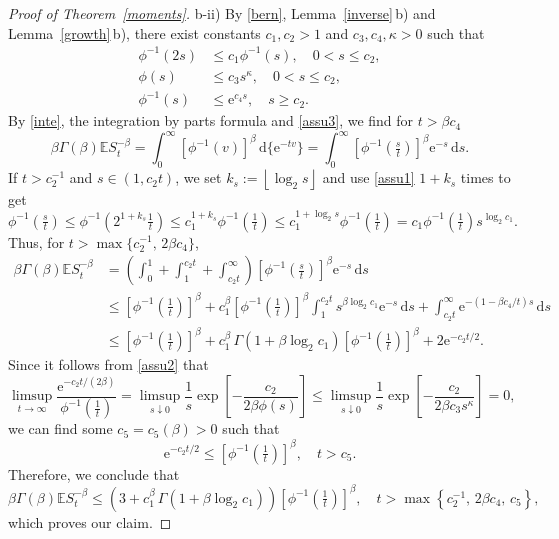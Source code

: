 \documentclass{aptpub}
\newcommand\EE{\mathds E}
\newcommand\dup{\mathrm{d}}
\newcommand\eup{\mathrm{e}}                                %
\numberwithin{equation}{section}
\begin{document}
\begin{proof}[Proof of Theorem~\ref{moments}]
\medskip\noindent b-ii)
By \eqref{bern}, Lemma~\ref{inverse}\,b) and Lemma~\ref{growth}\,b), there exist constants $c_1,c_2>1$ and  $c_3,c_4,\kappa>0$ such that
\begin{align}\label{assu1}
    \phi^{-1}(2s)
    &\leq c_1\phi^{-1}(s), \quad 0<s\leq c_2,
\\ \label{assu2}
    \phi(s)
    &\leq c_3s^\kappa, \quad 0<s\leq c_2,
\\ \label{assu3}
    \phi^{-1}(s)
    &\leq\eup^{c_4s},\quad s\geq c_2.
\end{align}
By \eqref{inte}, the integration by parts formula and \eqref{assu3}, we find for $t>\beta c_4$
$$
    \beta\Gamma(\beta)\EE S_t^{-\beta}
    = \int_0^\infty\left[\phi^{-1}(v)\right]^{\beta} \,\dup\bigl\{\eup^{-tv}\bigr\}
    = \int_0^\infty\left[ \phi^{-1}\left(\tfrac{s}{t}\right) \right]^{\beta}\eup^{-s}\,\dup s.
$$
If $t>c_2^{-1}$ and $s\in(1,c_2t)$, we set $k_s:=\left\lfloor\log_2s\right\rfloor$ and use \eqref{assu1} $1+k_s$ times to get
$$
    \phi^{-1}\left(\tfrac{s}{t}\right)
    \leq\phi^{-1}\left(2^{1+k_s}\tfrac 1{t}\right)
    \leq c_1^{1+k_s}\phi^{-1}\left(\tfrac{1}{t}\right)
    \leq c_1^{1+\log_2s}\phi^{-1}\left(\tfrac{1}{t}\right)
    =c_1\phi^{-1}\left(\tfrac{1}{t}\right)s^{\log_2c_1}.
$$
Thus, for $t>\max\{c_2^{-1},\,2\beta c_4\}$,
\begin{align*}
    \beta\Gamma(\beta)\EE S_t^{-\beta}
    &=\left(\int_0^1+\int_1^{c_2 t} + \int_{c_2 t}^\infty\right)
      \left[ \phi^{-1}\left(\tfrac{s}{t}\right)\right]^{\beta}\eup^{-s}\,\dup s\\
    &\leq\left[\phi^{-1}\left(\tfrac{1}{t}\right)\right]^{\beta}
      + c_1^\beta\left[ \phi^{-1}\left(\tfrac{1}{t}\right) \right]^{\beta}\int_1^{c_2 t} s^{\beta\log_2c_1}\eup^{-s}\,\dup s
      + \int_{c_2 t}^\infty \eup^{-\left(1-\beta c_4/t\right)s}\,\dup s\\
    &\leq \left[\phi^{-1}\left(\tfrac{1}{t}\right)\right]^{\beta}
      + c_1^\beta\,\Gamma\left(1+\beta\log_2c_1\right) \left[\phi^{-1}\left(\tfrac{1}{t}\right)\right]^{\beta}
      + 2\eup^{-c_2 t/2}.
\end{align*}
Since it follows from \eqref{assu2} that
$$
    \limsup_{t\to\infty} \frac{\eup^{-c_2t/(2\beta)}}{\phi^{-1}\left(\frac{1}{t}\right)}
    = \limsup_{s\downarrow0} \frac{1}{s}\exp\left[-\frac{c_2}{2\beta\phi(s)}\right]
    \leq \limsup_{s\downarrow0}\frac{1}{s}\exp\left[-\frac{c_2}{2\beta c_3s^{\kappa}}\right]
    = 0,
$$
we can find some $c_5=c_5(\beta)>0$ such that
$$
    \eup^{-c_2 t/2}
    \leq \left[\phi^{-1}\left(\tfrac{1}{t}\right)\right]^{\beta},
    \quad t>c_5.
$$
Therefore, we conclude that
$$
    \beta\Gamma(\beta)\EE S_t^{-\beta}
    \leq \left(3+c_1^\beta\,\Gamma\left(1+\beta\log_2c_1\right)\right)
         \left[\phi^{-1}\left(\tfrac{1}{t}\right)\right]^{\beta},
         \quad t>\max\left\{c_2^{-1},\,2\beta c_4,\,c_5\right\},
$$
which proves our claim.


\end{proof}
\end{document}
